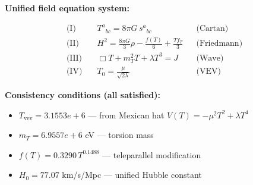 
\textbf{Unified field equation system:}

\begin{align}
  \text{(I)} \quad & T^a{}_{bc} = 8\pi G \, s^a{}_{bc} && \text{(Cartan)} \\
  \text{(II)} \quad & H^2 = \frac{8\pi G}{3}\rho - \frac{f(T)}{6} + \frac{Tf_T}{3} && \text{(Friedmann)} \\
  \text{(III)} \quad & \Box T + m_T^2 T + \lambda T^3 = J && \text{(Wave)} \\
  \text{(IV)} \quad & T_0 = \frac{\mu}{\sqrt{2\lambda}} && \text{(VEV)}
\end{align}

\textbf{Consistency conditions (all satisfied):}
\begin{itemize}
  \item $T_{\text{vev}} = 3.1553e+6$ — from Mexican hat $V(T) = -\mu^2 T^2 + \lambda T^4$
  \item $m_T = 6.9557e+6$ eV — torsion mass
  \item $f(T) = 0.3290 \, T^{0.1488}$ — teleparallel modification
  \item $H_0 = 77.07$ km/s/Mpc — unified Hubble constant
\end{itemize}